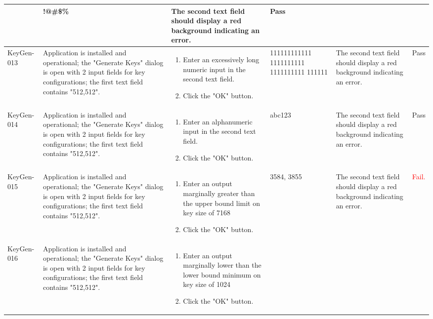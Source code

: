 \documentclass[]{final_report}
\theoremstyle{definition}
\begin{document}
\begin{longtable}{|p{1.5cm}|p{2.5cm}|p{3.5cm}|p{2.5cm}|p{3cm}|p{2cm}|}
\begin{enumerate}
  \end{enumerate} & !@\#\$\% & The second text field should display a red background indicating an error. & Pass \\
  \hline
  KeyGen-013 & Application is installed and operational; the "Generate Keys" dialog is open with 2 input fields for key configurations; the first text field contains "512,512". & 
  \begin{enumerate}
  \item Enter an excessively long numeric input in the second text field.
  \item Click the "OK" button.
  \end{enumerate} & 111111111111
  1111111111
  1111111111
  111111 & The second text field should display a red background indicating an error. & Pass \\
  \hline
  KeyGen-014 & Application is installed and operational; the "Generate Keys" dialog is open with 2 input fields for key configurations; the first text field contains "512,512". & 
  \begin{enumerate}
  \item Enter an alphanumeric input in the second text field.
  \item Click the "OK" button.
  \end{enumerate} & abc123 & The second text field should display a red background indicating an error. & Pass \\
  \hline
    KeyGen-015 & Application is installed and operational; the "Generate Keys" dialog is open with 2 input fields for key configurations; the first text field contains "512,512". & 
  \begin{enumerate}
  \item Enter an output marginally greater than the upper bound limit on key size of 7168
  \item Click the "OK" button.
  \end{enumerate} & 3584, 3855 & The second text field should display a red background indicating an error. & \textcolor{red}{Fail.} \\
  \hline
    KeyGen-016 & Application is installed and operational; the "Generate Keys" dialog is open with 2 input fields for key configurations; the first text field contains "512,512". & 
  \begin{enumerate}
  \item Enter an output marginally lower than the lower bound minimum on key size of 1024
  \item Click the "OK" button.

\end{enumerate}
\end{longtable}
\end{document}
